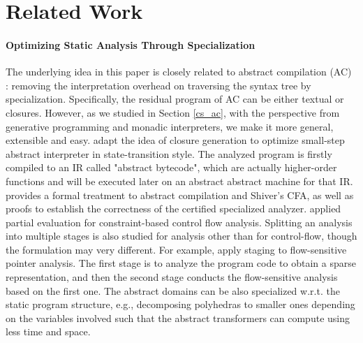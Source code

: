 \section{Related Work}


\paragraph{Optimizing Static Analysis Through Specialization}
The underlying idea in this paper is closely related to abstract compilation (AC)
\cite{Boucher:1996:ACN:647473.727587}: removing the interpretation overhead on
traversing the syntax tree by specialization. Specifically, the residual program
of AC can be either textual or closures. However, as we studied in Section
\ref{cs_ac}, with the perspective from generative programming and monadic
interpreters, we make it more general, extensible and easy.
\citet{Johnson:2013:OAA:2500365.2500604} adapt the idea of closure
generation to optimize small-step abstract interpreter in state-transition
style. The analyzed program is firstly compiled to an IR called "abstract
bytecode", which are actually higher-order functions and will be executed later
on an abstract abstract machine for that IR. \citet{damian1999partial} provides a
formal treatment to abstract compilation and Shiver's CFA, as well as proofs to
establish the correctness of the certified specialized analyzer.
\citet{amtoft1999partial} applied partial evaluation for constraint-based
control flow analysis. Splitting an analysis into multiple stages is also
studied for analysis other than for control-flow, though the formulation may
very different. For example, \citet{DBLP:conf/cgo/HardekopfL11} apply staging to
flow-sensitive pointer analysis. The first stage is to analyze the program code
to obtain a sparse representation, and then the second stage conducts the
flow-sensitive analysis based on the first one.
The abstract domains can be also specialized w.r.t. the static program
structure, e.g., decomposing polyhedras \cite{DBLP:conf/popl/SinghPV17,
Singh:2017:PCD:3177123.3158143} to smaller ones depending on the variables
involved such that the abstract transformers can compute using less time and
space.

